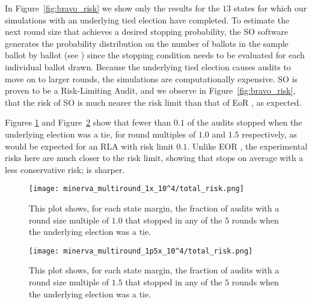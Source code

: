 In Figure~\ref{fig:bravo_risk} we show only the results for the $13$
states for which our simulations with an underlying tied election have completed.
To estimate the next round size that achieves a desired stopping probability,
the SO \BRAVO software generates the probability distribution on the number of ballots in the sample ballot by ballot (see \cite{usenix_minerva}) since
the stopping condition needs to be evaluated for each individual ballot drawn.
Because the underlying tied election causes audits to move on to larger rounds, 
the simulations are computationally expensive. SO \BRAVO is proven to be a Risk-Limiting Audit,
and we observe in Figure~\ref{fig:bravo_risk},
that the risk of SO \BRAVO is much
nearer the risk limit than that of EoR \BRAVO, as expected. 



Figures \ref{fig:minerva1_risk} and Figure~\ref{fig:minerva1p5_risk} show that fewer than $0.1$ of the audits stopped when the underlying election was a tie, for round multiples of $1.0$ and $1.5$ respectively, as would be expected for an RLA with risk limit $0.1$. 
Unlike EOR \BRAVO, the experimental risks here are much closer to the risk limit,
showing that \Minerva stops on average with a less conservative risk; \Minerva is sharper.

\begin{figure}
\texttt{[image: minerva\_multiround\_1x\_10^4/total\_risk.png]}
\caption{This plot shows, for each state margin,
the fraction of \Minerva audits with a round size multiple of $1.0$ that stopped in any of the $5$ rounds when the underlying election was a tie.}
\label{fig:minerva1_risk}
\end{figure}




\begin{figure}
\texttt{[image: minerva\_multiround\_1p5x\_10^4/total\_risk.png]}
\caption{This plot shows, for each state margin,
the fraction of \Minerva audits with a round size multiple of $1.5$ that stopped in any of the $5$ rounds when the underlying election was a tie.}
\label{fig:minerva1p5_risk}
\end{figure}




